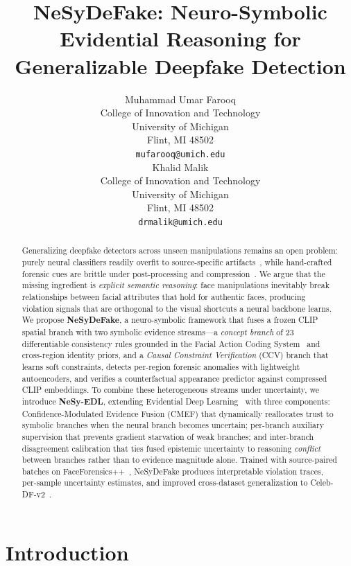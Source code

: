 \documentclass{article}
\title{NeSyDeFake: Neuro-Symbolic Evidential Reasoning for\\ Generalizable Deepfake Detection}
\author{%
  Muhammad Umar Farooq\\
  College of Innovation and Technology\\
  University of Michigan\\
  Flint, MI 48502 \\
  \texttt{mufarooq@umich.edu} \\
  \And
  Khalid Malik \\
  College of Innovation and Technology\\
  University of Michigan\\
  Flint, MI 48502 \\
  \texttt{drmalik@umich.edu} \\
}
\begin{document}
\maketitle


\begin{abstract}
Generalizing deepfake detectors across unseen manipulations remains an open problem: purely neural classifiers readily overfit to source-specific artifacts~\citep{rossler2019faceforensics,li2020face,shiohara2022detecting}, while hand-crafted forensic cues are brittle under post-processing and compression~\citep{luo2021generalizing,qian2020thinking}. We argue that the missing ingredient is \emph{explicit semantic reasoning}: face manipulations inevitably break relationships between facial attributes that hold for authentic faces, producing violation signals that are orthogonal to the visual shortcuts a neural backbone learns. We propose \textbf{NeSyDeFake}, a neuro-symbolic framework that fuses a frozen CLIP~\citep{radford2021clip} spatial branch with two symbolic evidence streams---a \emph{concept branch} of 23 differentiable consistency rules grounded in the Facial Action Coding System~\citep{ekman1978facial} and cross-region identity priors, and a \emph{Causal Constraint Verification} (CCV) branch that learns soft constraints, detects per-region forensic anomalies with lightweight autoencoders, and verifies a counterfactual appearance predictor against compressed CLIP embeddings. To combine these heterogeneous streams under uncertainty, we introduce \textbf{NeSy-EDL}, extending Evidential Deep Learning~\citep{sensoy2018evidential} with three components: Confidence-Modulated Evidence Fusion (CMEF) that dynamically reallocates trust to symbolic branches when the neural branch becomes uncertain; per-branch auxiliary supervision that prevents gradient starvation of weak branches; and inter-branch disagreement calibration that ties fused epistemic uncertainty to reasoning \emph{conflict} between branches rather than to evidence magnitude alone. Trained with source-paired batches on FaceForensics++~\citep{rossler2019faceforensics}, NeSyDeFake produces interpretable violation traces, per-sample uncertainty estimates, and improved cross-dataset generalization to Celeb-DF-v2~\citep{li2020celeb}.
\end{abstract}

\section{Introduction}
\label{sec:intro}
\end{document}
